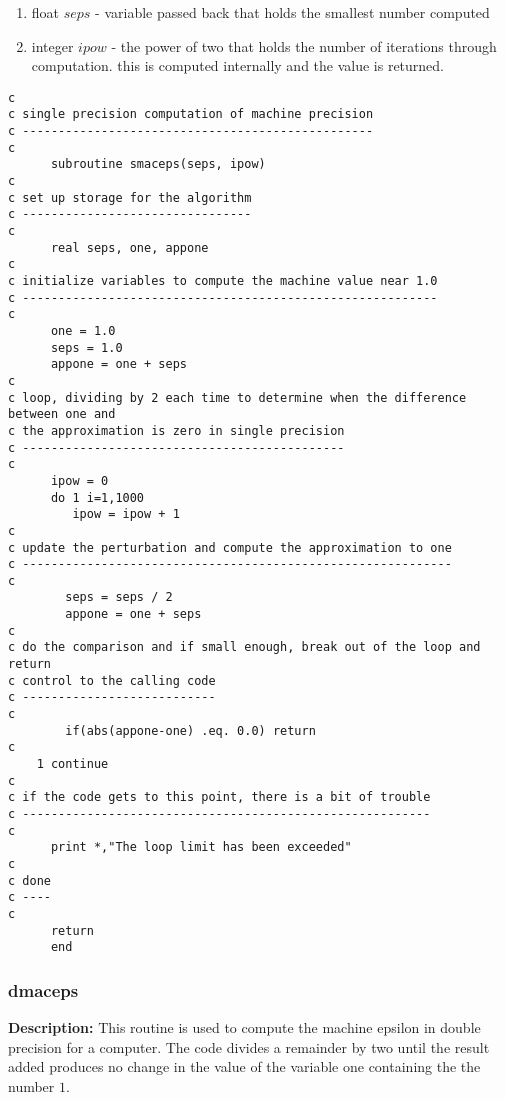 \vskip0.1in

\begin{enumerate}
\item float $seps$ - variable passed back that holds the smallest number
computed
\item integer $ipow$ - the power of two that holds the number of iterations
through computation. this is computed internally and the value is returned.
\end{enumerate}


\begin{verbatim}
c
c single precision computation of machine precision
c -------------------------------------------------
c
      subroutine smaceps(seps, ipow)
c
c set up storage for the algorithm
c --------------------------------
c
      real seps, one, appone
c
c initialize variables to compute the machine value near 1.0
c ----------------------------------------------------------
c
      one = 1.0
      seps = 1.0
      appone = one + seps
c
c loop, dividing by 2 each time to determine when the difference between one and
c the approximation is zero in single precision
c ---------------------------------------------
c
      ipow = 0
      do 1 i=1,1000
         ipow = ipow + 1
c
c update the perturbation and compute the approximation to one
c ------------------------------------------------------------
c
        seps = seps / 2
        appone = one + seps
c
c do the comparison and if small enough, break out of the loop and return
c control to the calling code
c ---------------------------
c
        if(abs(appone-one) .eq. 0.0) return
c
    1 continue
c
c if the code gets to this point, there is a bit of trouble
c ---------------------------------------------------------
c
      print *,"The loop limit has been exceeded"
c
c done
c ----
c
      return
      end

\end{verbatim}

\newpage

\subsubsection{dmaceps}

\vskip0.1in

\noindent
{\bf Description:} This routine is used to compute the machine epsilon in
double precision for a computer. The code divides a remainder by two until the
result added produces no change in the value of the variable one containing the
the number $1$.

